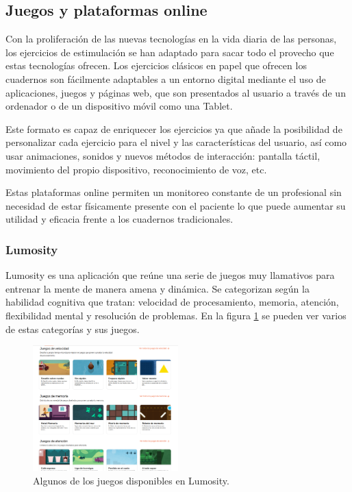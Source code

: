 \subsection{Juegos y plataformas online}

Con la proliferación de las nuevas tecnologías en la vida diaria de las personas, los ejercicios de estimulación se han adaptado para sacar todo el provecho que estas tecnologías ofrecen. Los ejercicios clásicos en papel que ofrecen los cuadernos son fácilmente adaptables a un entorno digital mediante el uso de aplicaciones, juegos y páginas web, que son presentados al usuario a través de un ordenador o de un dispositivo móvil como una Tablet.

Este formato es capaz de enriquecer los ejercicios ya que añade la posibilidad de personalizar cada ejercicio para el nivel y las características del usuario, así como usar animaciones, sonidos y nuevos métodos de interacción: pantalla táctil, movimiento del propio dispositivo, reconocimiento de voz, etc.

Estas plataformas online permiten un monitoreo constante de un profesional sin necesidad de estar físicamente presente con el paciente lo que puede aumentar su utilidad y eficacia frente a los cuadernos tradicionales.

\subsubsection{Lumosity}

Lumosity es una aplicación que reúne una serie de juegos muy llamativos para entrenar la mente de manera amena y dinámica. Se categorizan según la habilidad cognitiva que tratan: velocidad de procesamiento, memoria, atención, flexibilidad mental y resolución de problemas. En la figura \ref{fig:EA_lumosity} se pueden ver varios de estas categorías y sus juegos.

\begin{figure}
  \centering
\includegraphics[width=0.5\textwidth]{03.EstudioProblema/01.EstadoArte/00.Figuras/05.lumosity.png}
    \caption{Algunos de los juegos disponibles en Lumosity.}
    \label{fig:EA_lumosity}
\end{figure}


